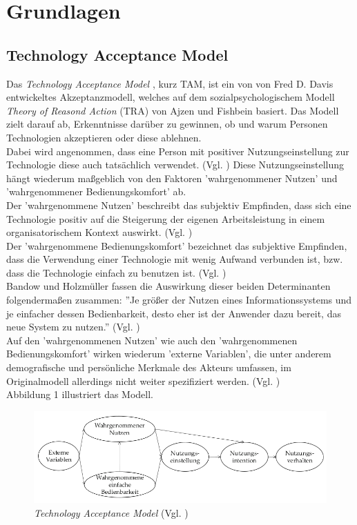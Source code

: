 \documentclass[deutsch]{lib/llncs/llncs}
\begin{document}
\newpage


\section{Grundlagen}


\subsection{Technology Acceptance Model}
Das \textit{Technology Acceptance Model} \cite{Zitat01}, kurz TAM, ist ein von von Fred D. Davis entwickeltes Akzeptanzmodell, welches auf dem sozialpsychologischem Modell \textit{Theory of Reasond Action} (TRA) von Ajzen und Fishbein \cite{Zitat04} basiert. Das Modell zielt darauf ab, Erkenntnisse darüber zu gewinnen, ob und warum Personen Technologien akzeptieren oder diese ablehnen. \\
Dabei wird angenommen, dass eine Person mit positiver Nutzungseinstellung zur Technologie diese auch tatsächlich verwendet. (Vgl. \cite[S. 237]{Zitat03}) Diese Nutzungseinstellung hängt wiederum maßgeblich von den Faktoren 'wahrgenommener Nutzen' und 'wahrgenommener Bedienungskomfort' ab. \\
Der 'wahrgenommene Nutzen' beschreibt das subjektiv Empfinden, dass sich eine Technologie positiv auf die Steigerung der eigenen Arbeitsleistung in einem organisatorischem Kontext auswirkt.  (Vgl. \cite[S. 320]{Zitat02}) \\
Der 'wahrgenommene Bedienungskomfort' bezeichnet das subjektive Empfinden, dass die Verwendung einer Technologie mit wenig Aufwand verbunden ist, bzw. dass die Technologie einfach zu benutzen ist. (Vgl. \cite[S. 320]{Zitat02}) \\
Bandow und Holzmüller fassen die Auswirkung dieser beiden Determinanten folgendermaßen zusammen: ''Je größer der Nutzen eines Informationssystems und je einfacher dessen Bedienbarkeit, desto eher ist der Anwender dazu bereit, das neue System zu nutzen.'' (Vgl. \cite[S. 237]{Zitat03}) \\
Auf den 'wahrgenommenen Nutzen' wie auch den 'wahrgenommenen Bedienungskomfort' wirken wiederum 'externe Variablen', die unter anderem demografische und persönliche Merkmale des Akteurs umfassen, im Originalmodell allerdings nicht weiter spezifiziert werden. (Vgl. \cite[S. 21]{Zitat01}) \\
Abbildung 1 illustriert das Modell.
\begin{figure}
	\centering
	\includegraphics[scale=0.40]{img/abbildung1.png}
	\caption{\textit{Technology Acceptance Model} (Vgl. \cite[S. 237]{Zitat03})}
\end{figure}
\end{document}

